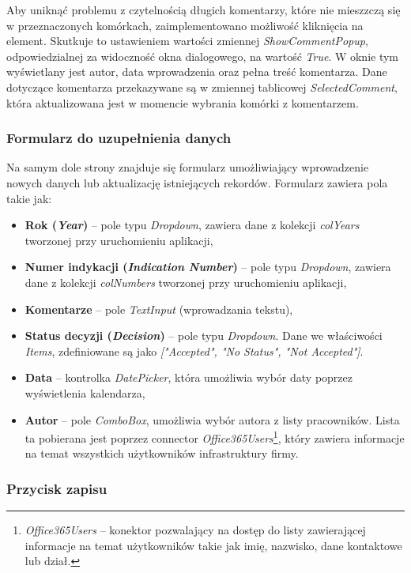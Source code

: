 Aby uniknąć problemu z czytelnością długich komentarzy, które nie mieszzczą się w przeznaczonych komórkach, zaimplementowano możliwość kliknięcia na element. Skutkuje to ustawieniem wartości zmiennej \emph{ShowCommentPopup}, odpowiedzialnej za widoczność okna dialogowego, na wartość \emph{True}. W oknie tym wyświetlany jest autor, data wprowadzenia oraz pełna treść komentarza. Dane dotyczące komentarza przekazywane są w zmiennej tablicowej \emph{SelectedComment}, która aktualizowana jest w momencie wybrania komórki z komentarzem.

\subsubsection*{Formularz do uzupełnienia danych}

Na samym dole strony znajduje się formularz umożliwiający wprowadzenie nowych danych lub aktualizację istniejących rekordów. Formularz zawiera pola takie jak:
\begin{itemize}
    \item \textbf{Rok (\emph{Year})} -- pole typu \emph{Dropdown}, zawiera dane z kolekcji \emph{colYears} tworzonej przy uruchomieniu aplikacji,
    \item \textbf{Numer indykacji (\emph{Indication Number})} -- pole typu \emph{Dropdown}, zawiera dane z kolekcji \emph{colNumbers} tworzonej przy uruchomieniu aplikacji,
    \item \textbf{Komentarze} -- pole \emph{TextInput} (wprowadzania tekstu),
    \item \textbf{Status decyzji (\emph{Decision})} -- pole typu \emph{Dropdown}. Dane we właściwości \emph{Items}, zdefiniowane są jako \emph{["Accepted", "No Status", "Not Accepted"]}.
    \item \textbf{Data} -- kontrolka \emph{DatePicker}, która umożliwia wybór daty poprzez wyświetlenia kalendarza,
    \item \textbf{Autor} -- pole \emph{ComboBox}, umożliwia wybór autora z listy pracowników. Lista ta pobierana jest poprzez connector \emph{Office365Users}\footnote{\emph{Office365Users} -- konektor pozwalający na dostęp do listy zawierającej informacje na temat użytkowników takie jak imię, nazwisko, dane kontaktowe lub dział.}, który zawiera informacje na temat wszystkich użytkowników infrastruktury firmy.
\end{itemize}


\subsubsection*{Przycisk zapisu}


